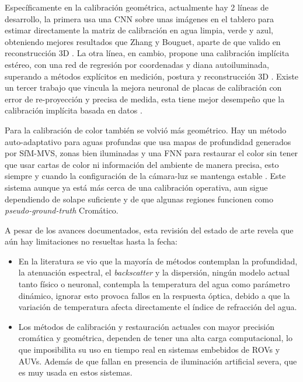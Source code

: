 \documentclass[12pt,letterpaper,spanish,twoside,openright]{report}
\begin{document}
Específicamente en la calibración geométrica, actualmente hay 2 líneas de desarrollo, la primera usa una CNN sobre unas imágenes en el tablero para estimar directamente la matriz de calibración en agua limpia, verde y azul, obteniendo mejores resultados que Zhang y Bouguet, aparte de que valido en reconstrucción 3D \parencite{10772075}. La otra línea, en cambio, propone una calibración implícita estéreo, con una red de regresión por coordenadas y diana autoiluminada, superando a métodos explícitos en medición, postura y reconstrucción 3D \parencite{Meng:24}. Existe un tercer trabajo que vincula la mejora neuronal de placas de calibración con error de re-proyección y precisa de medida, esta tiene mejor desempeño que la calibración implícita basada en datos \parencite{Zhou2025Probabilistic}.

Para la calibración de color también se volvió más geométrico. Hay un método auto-adaptativo para aguas profundas que usa mapas de profundidad generados por SfM-MVS, zonas bien iluminadas y una FNN para restaurar el color sin tener que usar cartas de color ni información del ambiente de manera precisa, esto siempre y cuando la configuración de la cámara-luz se mantenga estable \parencite{rs16071279}. Este sistema aunque ya está más cerca de una calibración operativa, aun sigue dependiendo de solape suficiente y de que algunas regiones funcionen como \textit{pseudo-ground-truth} Cromático.

A pesar de los avances documentados, esta revisión del estado de arte revela que aún hay limitaciones no resueltas hasta la fecha:
\begin{itemize}
  \item En la literatura se vio que la mayoría de métodos contemplan la profundidad, la atenuación espectral, el \textit{backscatter} y la dispersión, ningún modelo actual tanto físico o neuronal, contempla la temperatura del agua como parámetro dinámico, ignorar esto provoca fallos en la respuesta óptica, debido a que la variación de temperatura afecta directamente el índice de refracción del agua.
  \item Los métodos de calibración y restauración actuales con mayor precisión cromática y geométrica, dependen de tener una alta carga computacional, lo que imposibilita su uso en tiempo real en sistemas embebidos de ROVs y AUVs. Además de que fallan en presencia de iluminación artificial severa, que es muy usada en estos sistemas.
\end{itemize}
\end{document}
